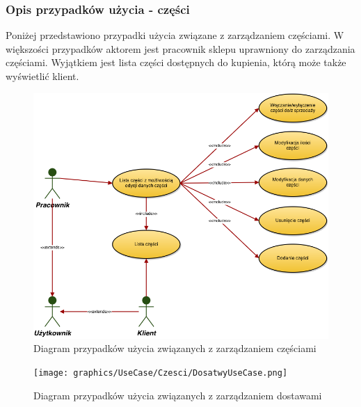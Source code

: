 \subsubsection{Opis przypadków użycia - części}

Poniżej przedstawiono przypadki użycia związane z zarządzaniem częściami. W większości przypadków aktorem jest pracownik sklepu uprawniony do zarządzania częściami. Wyjątkiem jest lista części dostępnych do kupienia, którą może także wyświetlić klient.

\begin{figure}[h!]
    \includegraphics[width=\textwidth,
    height=0.5\textheight]{graphics/UseCase/Czesci/UseCaseDiagram.png}
  \caption{Diagram przypadków użycia związanych z zarządzaniem częściami}
\end{figure}

\begin{figure}[h!]
    \texttt{[image: graphics/UseCase/Czesci/DosatwyUseCase.png]}
  \caption{Diagram przypadków użycia związanych z zarządzaniem dostawami}
\end{figure}

\newpage
\begin{enumerate}
  
  
  
  
  
\end{enumerate}